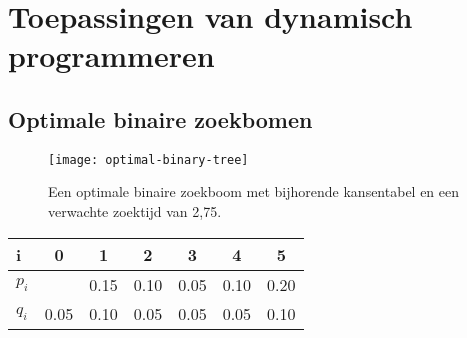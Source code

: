 \chapter{Toepassingen van dynamisch programmeren}
\section{Optimale binaire zoekbomen}
\begin{figure}[ht]
    \centering
    \texttt{[image: optimal-binary-tree]}
    \caption{Een optimale binaire zoekboom met bijhorende kansentabel en een verwachte zoektijd van 2,75.}
    \label{}
\end{figure}

\begin{table}[ht]
    \centering
    \begin{tabular}{l | c c c c c c}
        i & 0 & 1 & 2 & 3 & 4 & 5 \\
        \hline
        $p_i$ & & 0.15 & 0.10 & 0.05 & 0.10 & 0.20 \\
        $q_i$ & 0.05 & 0.10 & 0.05 &0.05 &0.05 & 0.10  
    \end{tabular}
\end{table}
